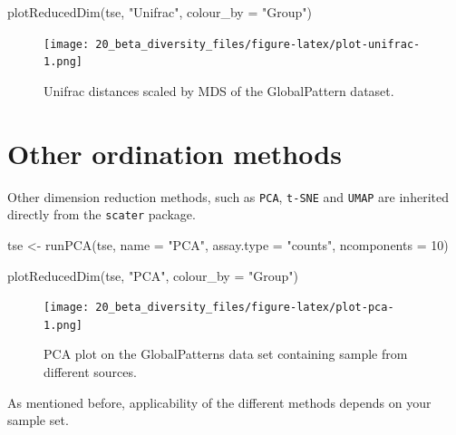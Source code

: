 \documentclass[
]{book}
\newenvironment{Shaded}{\begin{snugshade}}{\end{snugshade}}
\newcommand{\AttributeTok}[1]{\textcolor[rgb]{0.77,0.63,0.00}{#1}}
\newcommand{\DecValTok}[1]{\textcolor[rgb]{0.00,0.00,0.81}{#1}}
\newcommand{\FunctionTok}[1]{\textcolor[rgb]{0.00,0.00,0.00}{#1}}
\newcommand{\NormalTok}[1]{#1}
\newcommand{\OtherTok}[1]{\textcolor[rgb]{0.56,0.35,0.01}{#1}}
\newcommand{\StringTok}[1]{\textcolor[rgb]{0.31,0.60,0.02}{#1}}
\begin{document}
\begin{Shaded}
\begin{Highlighting}[]
\FunctionTok{plotReducedDim}\NormalTok{(tse, }\StringTok{"Unifrac"}\NormalTok{, }\AttributeTok{colour\_by =} \StringTok{"Group"}\NormalTok{)}
\end{Highlighting}
\end{Shaded}

\begin{figure}
\centering
\texttt{[image: 20\_beta\_diversity\_files/figure-latex/plot-unifrac-1.png]}
\caption{\label{fig:plot-unifrac}Unifrac distances scaled by MDS of the GlobalPattern dataset.}
\end{figure}

\hypertarget{other-ordination-methods}{%
\section{Other ordination methods}\label{other-ordination-methods}}

Other dimension reduction methods, such as \texttt{PCA}, \texttt{t-SNE} and \texttt{UMAP} are
inherited directly from the \texttt{scater} package.

\begin{Shaded}
\begin{Highlighting}[]
\NormalTok{tse }\OtherTok{\textless{}{-}} \FunctionTok{runPCA}\NormalTok{(tse, }\AttributeTok{name =} \StringTok{"PCA"}\NormalTok{, }\AttributeTok{assay.type =} \StringTok{"counts"}\NormalTok{, }\AttributeTok{ncomponents =} \DecValTok{10}\NormalTok{)}
\end{Highlighting}
\end{Shaded}

\begin{Shaded}
\begin{Highlighting}[]
\FunctionTok{plotReducedDim}\NormalTok{(tse, }\StringTok{"PCA"}\NormalTok{, }\AttributeTok{colour\_by =} \StringTok{"Group"}\NormalTok{)}
\end{Highlighting}
\end{Shaded}

\begin{figure}
\centering
\texttt{[image: 20\_beta\_diversity\_files/figure-latex/plot-pca-1.png]}
\caption{\label{fig:plot-pca}PCA plot on the GlobalPatterns data set containing sample from different sources.}
\end{figure}

As mentioned before, applicability of the different methods depends on your
sample set.
\end{document}
